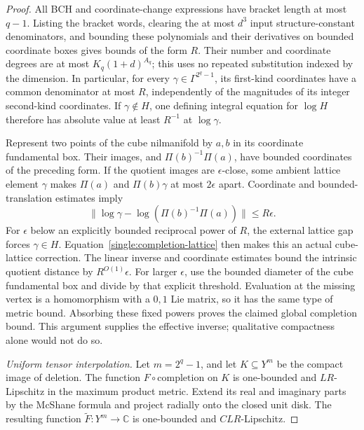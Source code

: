 \documentclass[11pt,a4paper]{article}
\theoremstyle{definition}
\begin{document}
\begin{proof}
All BCH and coordinate-change expressions have bracket length at most
\(q-1\).  Listing the bracket words, clearing the at most \(d^3\)
input structure-constant denominators, and bounding these polynomials
and their derivatives on bounded coordinate boxes gives bounds of
the form \(R\).  Their number and coordinate degrees are at most
\(K_q(1+d)^{A_q}\); this uses no repeated substitution indexed by
the dimension.  In particular, for every
\(\gamma\in\Gamma^{2^q-1}\), its first-kind coordinates have a
common denominator at most \(R\), independently of the magnitudes
of its integer second-kind coordinates.  If \(\gamma\notin H\),
one defining integral equation for \(\log H\) therefore has
absolute value at least \(R^{-1}\) at \(\log\gamma\).

Represent two points of the cube nilmanifold by \(a,b\) in its
coordinate fundamental box.  Their images, and
\(\Pi(b)^{-1}\Pi(a)\), have bounded coordinates of the preceding
form.  If the quotient images are \(\epsilon\)-close, some ambient
lattice element \(\gamma\) makes \(\Pi(a)\) and
\(\Pi(b)\gamma\) at most \(2\epsilon\) apart.  Coordinate and
bounded-translation estimates imply
\[
 \bigl\|\log\gamma-
       \log(\Pi(b)^{-1}\Pi(a))\bigr\|\le R\epsilon.
\]
For \(\epsilon\) below an explicitly bounded reciprocal power of
\(R\), the external lattice gap forces \(\gamma\in H\).
Equation~\eqref{single:completion-lattice} then makes this an actual
cube-lattice correction.  The linear inverse and coordinate estimates
bound the intrinsic quotient distance by \(R^{O(1)}\epsilon\).
For larger \(\epsilon\), use the bounded diameter of the cube
fundamental box and divide by that explicit threshold.  Evaluation
at the missing vertex is a homomorphism with a \(0,1\) Lie matrix,
so it has the same type of metric bound.  Absorbing these fixed powers
proves the claimed global completion bound.  This argument supplies
the effective inverse; qualitative compactness alone would not do so.

\textit{Uniform tensor interpolation.}
Let \(m=2^q-1\), and let \(K\subseteq Y^m\) be the compact image
of deletion.  The function \(F\circ\mathrm{completion}\) on \(K\)
is one-bounded and \(LR\)-Lipschitz in the maximum product metric.
Extend its real and imaginary parts by the McShane formula and project
radially onto the closed unit disk.  The resulting function
\(\widetilde F:Y^m\to\mathbb C\) is one-bounded and
\(C LR\)-Lipschitz.


\end{proof}
\end{document}
